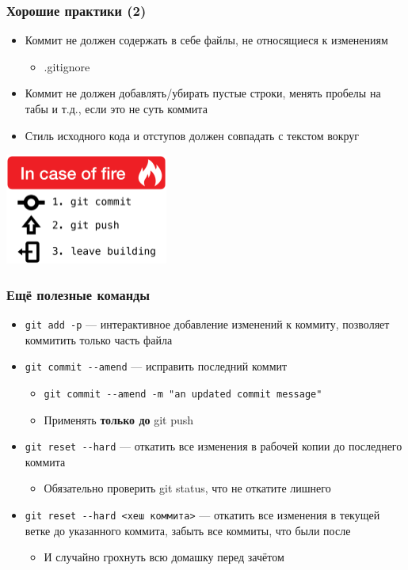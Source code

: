 \documentclass[xetex,mathserif,serif]{beamer}
\begin{document}
	\begin{frame}
		\frametitle{Хорошие практики (2)}
		\begin{itemize}
			\item Коммит не должен содержать в себе файлы, не относящиеся к изменениям
			\begin{itemize}
				\item .gitignore
			\end{itemize}
			\item Коммит не должен добавлять/убирать пустые строки, менять пробелы на табы и т.д., если это не суть коммита
			\item Стиль исходного кода и отступов должен совпадать с текстом вокруг
		\end{itemize}
		\begin{center}
			\includegraphics[width=0.4\textwidth]{inCaseOfFire.png}
		\end{center}
	\end{frame}

	\begin{frame}[fragile]
		\frametitle{Ещё полезные команды}
		\begin{itemize}
			\item \verb|git add -p| --- интерактивное добавление изменений к коммиту, позволяет коммитить только часть файла
			\item \verb|git commit --amend| --- исправить последний коммит
			\begin{itemize}
				\item \verb|git commit --amend -m "an updated commit message"|
				\item Применять \textbf{только до} git push
			\end{itemize}
			\item \verb|git reset --hard| --- откатить все изменения в рабочей копии до последнего коммита
			\begin{itemize}
				\item Обязательно проверить git status, что не откатите лишнего
			\end{itemize}
			\item \verb|git reset --hard <хеш коммита>| --- откатить все изменения в текущей ветке до указанного коммита, забыть все коммиты, что были после
			\begin{itemize}
				\item И случайно грохнуть всю домашку перед зачётом
			\end{itemize}
		\end{itemize}
	\end{frame}
	
\end{document}
